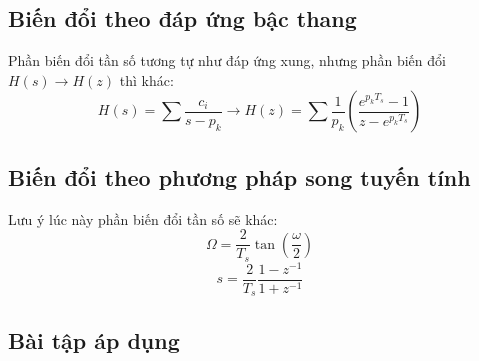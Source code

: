 \documentclass{article}
\begin{document}
\subsection{Biến đổi theo đáp ứng bậc thang}
Phần biến đổi tần số tương tự như đáp ứng xung, nhưng phần biến đổi $H(s)\to H(z)$ thì khác:
$$H(s)=\sum\frac{c_{i}}{s-p_{k}}\to H(z)=\sum\frac{1}{p_{k}}\left(\frac{e^{p_{k}T_{s}}-1}{z-e^{p_{k}T_{s}}}\right)$$
\subsection{Biến đổi theo phương pháp song tuyến tính}
Lưu ý lúc này phần biến đổi tần số sẽ khác:
$$\Omega=\frac{2}{T_{s}}\tan{\left(\frac{\omega}{2}\right)}$$
$$s=\frac{2}{T_{s}}\frac{1-z^{-1}}{1+z^{-1}}$$
\subsection{Bài tập áp dụng}
\end{document}
